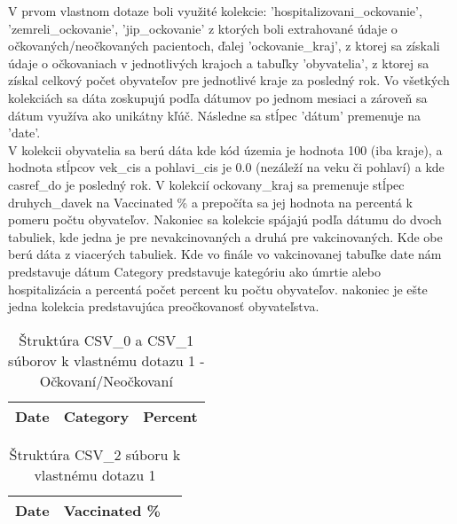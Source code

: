 \documentclass[a4paper, 16pt]{article}
\begin{document}
V prvom vlastnom dotaze boli využité kolekcie:  'hospitalizovani\_ockovanie', 'zemreli\_ockovanie', 'jip\_ockovanie' z ktorých boli extrahované údaje o očkovaných/neočkovaných pacientoch, ďalej 'ockovanie\_kraj', z ktorej sa získali údaje o očkovaniach v jednotlivých krajoch a tabuľky 'obyvatelia', z ktorej sa získal celkový počet obyvateľov pre jednotlivé kraje za posledný rok. Vo všetkých kolekciách sa dáta zoskupujú podľa dátumov po jednom mesiaci a zároveň sa dátum využíva ako unikátny kľúč. Následne sa stĺpec 'dátum' premenuje na 'date'.\\
V kolekcii obyvatelia sa berú dáta kde kód územia je hodnota 100 (iba kraje), a hodnota stĺpcov vek\_cis a pohlavi\_cis je 0.0 (nezáleží na veku či pohlaví) a kde casref\_do je posledný rok. V kolekcií ockovany\_kraj sa premenuje stĺpec druhych\_davek na Vaccinated \% a prepočíta sa jej hodnota na percentá k pomeru počtu obyvateľov. Nakoniec sa kolekcie spájajú podľa dátumu do dvoch tabuliek, kde jedna je pre nevakcinovaných a druhá pre vakcinovaných. Kde obe berú dáta z viacerých tabuliek. Kde vo finále vo vakcinovanej tabuľke date nám predstavuje dátum Category predstavuje kategóriu ako úmrtie alebo hospitalizácia a percentá počet percent ku počtu obyvateľov. nakoniec je ešte jedna kolekcia predstavujúca preočkovanosť obyvateľstva.

\begin{table}[H]\centering
\begin{tabular}{|l|l|l|}
\hline
\textbf{Date} & Category & Percent \\ \hline
\end{tabular}
\caption{Štruktúra CSV\_0 a CSV\_1 súborov k vlastnému dotazu 1 - Očkovaní/Neočkovaní}
\end{table}

\begin{table}[H]\centering
\begin{tabular}{|l|l|l|}
\hline
\textbf{Date} & Vaccinated \% \\ \hline
\end{tabular}
\caption{Štruktúra CSV\_2 súboru k vlastnému dotazu 1}
\end{table}
\end{document}
